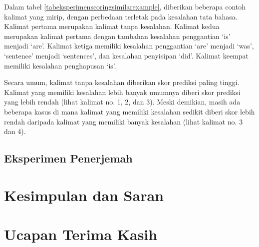 \documentclass[conference]{IEEEtran}
\begin{document}
Dalam tabel \ref{tabeksperimenscoringsimilarexample}, diberikan beberapa contoh kalimat yang mirip, dengan perbedaan terletak pada kesalahan tata bahasa. Kalimat pertama merupakan kalimat tanpa kesalahan. Kalimat kedua merupakan kalimat pertama dengan tambahan kesalahan penggantian ‘is’ menjadi ‘are’. Kalimat ketiga memiliki kesalahan penggantian ‘are’ menjadi ‘was’, ‘sentence’ menjadi ‘sentences’, dan kesalahan penyisipan ‘did’. Kalimat keempat memiliki kesalahan penghapusan ‘is’.

Secara umum, kalimat tanpa kesalahan diberikan skor prediksi paling tinggi. Kalimat yang memiliki kesalahan lebih banyak umumnya diberi skor prediksi yang lebih rendah (lihat kalimat no. 1, 2, dan 3). Meski demikian, masih ada beberapa kasus di mana kalimat yang memiliki kesalahan sedikit diberi skor lebih rendah daripada kalimat yang memiliki banyak kesalahan (lihat kalimat no. 3 dan 4).

\subsection{Eksperimen Penerjemah}

\section{Kesimpulan dan Saran}

\section*{Ucapan Terima Kasih}
\end{document}
